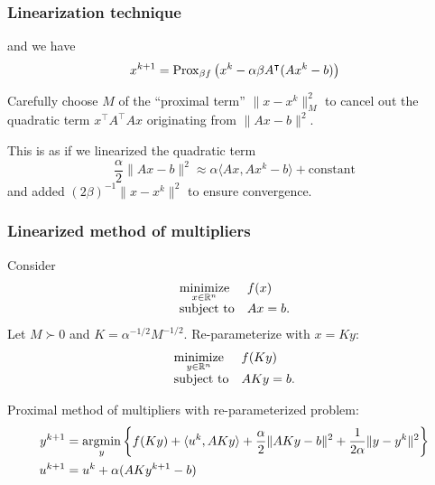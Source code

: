 \documentclass[10pt,mathserif]{beamer}
\begin{document}
\begin{frame}
\frametitle{Linearization technique}
and we have
\[
x^{k+1}
=\mathrm{Prox}_{\beta f}\left(
x^{k}-\alpha\beta A^\intercal(Ax^k-b)
\right)
\]
\vspace{0.2in}

Carefully choose $M$ of the ``proximal term'' $\|x-x^k\|^2_M$ to cancel out the quadratic term $x^\intercal A^\intercal Ax$ originating from $\|Ax-b\|^2$.
\vspace{0.2in}

This is as if we linearized the quadratic term
\[
\frac{\alpha}{2}\|Ax-b\|^2\approx
\alpha \langle Ax,Ax^k-b\rangle %
+
\text{constant}
\]
and added $(2\beta)^{-1}\|x-x^k\|^2$ to ensure convergence.
\end{frame}

\begin{frame}
\frametitle{Linearized method of multipliers}
Consider
\[
\begin{array}{ll}
\underset{x\in \mathbb{R}^n}{\mbox{minimize}} &f(x)\\
\mbox{subject to} &Ax=b.
\end{array}
\]
Let $M\succ 0$ and $K=\alpha^{-1/2}M^{-1/2}$. Re-parameterize with $x=Ky$:
\[
\begin{array}{ll}
\underset{y\in \mathbb{R}^n}{\mbox{minimize}} &f(Ky)\\
\mbox{subject to} &AKy=b.
\end{array}
\]

Proximal method of multipliers with re-parameterized problem:
\begin{align*}
y^{k+1} &= \operatorname*{argmin}_y \left\{
f(Ky)+\langle  u ^k,AKy\rangle+\frac{\alpha}{2}\|AKy-b\|^2
+\frac{1}{2\alpha}\|y-y^k\|^2\right\}\\
 u ^{k+1} &=  u ^k+\alpha (AKy^{k+1}-b)
\end{align*}
\end{frame}
\end{document}
